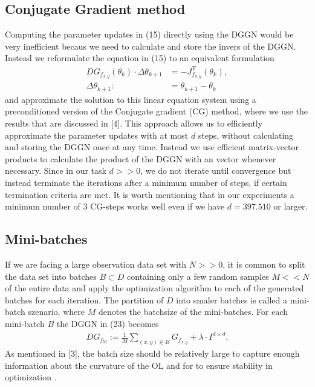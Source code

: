 \documentclass[conference]{IEEEtran}
\begin{document}
\subsection{Conjugate Gradient method}
Computing the parameter updates in (15) directly using the DGGN would be very inefficient becaus we need to calculate and store the invers of the DGGN. Instead we reformulate the equation in (15) to an equivalent formulation
\begin{align}
DG_{f_{x, y}}(\theta_{k})\cdot\Delta\theta_{k+1} &= -J_{f_{x, y}}^{\mathrm{T}}(\theta_{k}),\\
\Delta\theta_{k+1} :&= \theta_{k+1} - \theta_{k}
\end{align}
and approximate the solution to this linear equation system using a preconditioned version of the Conjugate gradient (CG) method, where we use the results that are discussed in [4]. 
This approach allows us to efficiently approximate the parameter updates with at most $d$ steps, without calculating and storing the DGGN once at any time. Instead we use efficient matrix-vector products to calculate the product of the DGGN with an vector whenever necessary. Since in our task $d>>0$, we do not iterate until convergence but instead terminate the iterations after a minimum number of steps, if certain termination criteria are met. It is worth mentioning that in our experiments a minimum number of 3 CG-steps works well even if we have $d=397.510$ or larger. 

\subsection{Mini-batches}
If we are facing a large observation data set with $N>>0$, it is common to split the data set into batches $B\subset D$ containing only a few random samples $M<<N$ of the entire data and apply the optimization algorithm to each of the generated batches for each iteration. The partition of $D$ into smaler batches is called a mini-batch szenario, where $M$ denotes the batchsize of the mini-batches. For each mini-batch $B$ the DGGN in (23) becomes
\begin{align}
DG_{f_{\mathrm{M}}} := \frac{1}{M}\sum_{(x, y)\in B}^{}G_{f_{x, y}} + \lambda\cdot I^{d\times d}.
\end{align}
As mentioned in [3], the batch size should be relatively large to capture enough information about the curvature of the OL and for to ensure stability in optimization . 
\end{document}

